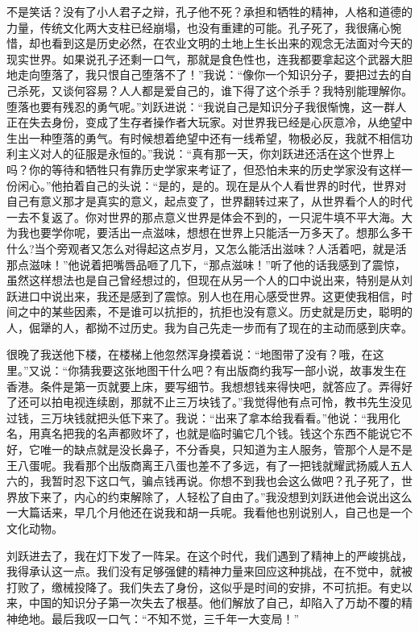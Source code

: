 \documentclass[12pt,oneside]{book}
\begin{document}
不是笑话？没有了小人君子之辩，孔子他不死？承担和牺牲的精神，人格和道德的力量，传统文化两大支柱已经崩塌，也没有重建的可能。孔子死了，我很痛心惋惜，却也看到这是历史必然，在农业文明的土地上生长出来的观念无法面对今天的现实世界。如果说孔子还剩一口气，那就是食色性也，连我都要拿起这个武器大胆地走向堕落了，我只恨自己堕落不了！''我说：``像你一个知识分子，要把过去的自己杀死，又谈何容易？人人都是爱自己的，谁下得了这个杀手？我特别能理解你。堕落也要有残忍的勇气呢。''刘跃进说：``我说自己是知识分子我很惭愧，这一群人正在失去身份，变成了生存者操作者大玩家。对世界我已经是心灰意冷，从绝望中生出一种堕落的勇气。有时候想着绝望中还有一线希望，物极必反，我就不相信功利主义对人的征服是永恒的。''我说：``真有那一天，你刘跃进还活在这个世界上吗？你的等待和牺牲只有靠历史学家来考证了，但恐怕未来的历史学家没有这样一份闲心。''他拍着自己的头说：``是的，是的。现在是从个人看世界的时代，世界对自己有意义那才是真实的意义，起点变了，世界翻转过来了，从世界看个人的时代一去不复返了。你对世界的那点意义世界是体会不到的，一只泥牛填不平大海。大为我也要学你呢，要活出一点滋味，想想在世界上只能活一万多天了。想那么多干什么?当个旁观者又怎么对得起这点岁月，又怎么能活出滋味？人活着吧，就是活那点滋味！''他说着把嘴唇品咂了几下，``那点滋味！''听了他的话我感到了震惊，虽然这样想法也是自己曾经想过的，但现在从另一个人的口中说出来，特别是从刘跃进口中说出来，我还是感到了震惊。别人也在用心感受世界。这更使我相信，时间之中的某些因素，不是谁可以抗拒的，抗拒也没有意义。历史就是历史，聪明的人，倔犟的人，都拗不过历史。我为自己先走一步而有了现在的主动而感到庆幸。

很晚了我送他下楼，在楼梯上他忽然浑身摸着说：``地图带了没有？哦，在这里。''又说：``你猜我要这张地图干什么吧？有出版商约我写一部小说，故事发生在香港。条件是第一页就要上床，要写细节。我想想钱来得快吧，就答应了。弄得好了还可以拍电视连续剧，那就不止三万块钱了。''我觉得他有点可怜，教书先生没见过钱，三万块钱就把头低下来了。我说：``出来了拿本给我看看。''他说：``我用化名，用真名把我的名声都败坏了，也就是临时骗它几个钱。钱这个东西不能说它不好，它唯一的缺点就是没长鼻子，不分香臭，只知道为主人服务，管那个人是不是王八蛋呢。我看那个出版商离王八蛋也差不了多远，有了一把钱就耀武扬威人五人六的，我暂时忍下这口气，骗点钱再说。你想不到我也会这么做吧？孔子死了，世界放下来了，内心的约束解除了，人轻松了自由了。''我没想到刘跃进他会说出这么一大篇话来，早几个月他还在说我和胡一兵呢。我看他也别说别人，自己也是一个文化动物。

刘跃进去了，我在灯下发了一阵呆。在这个时代，我们遇到了精神上的严峻挑战，我得承认这一点。我们没有足够强健的精神力量来回应这种挑战，在不觉中，就被打败了，缴械投降了。我们失去了身份，这似乎是时间的安排，不可抗拒。有史以来，中国的知识分子第一次失去了根基。他们解放了自己，却陷入了万劫不覆的精神绝地。最后我叹一口气：``不知不觉，三千年一大变局！''
\end{document}
